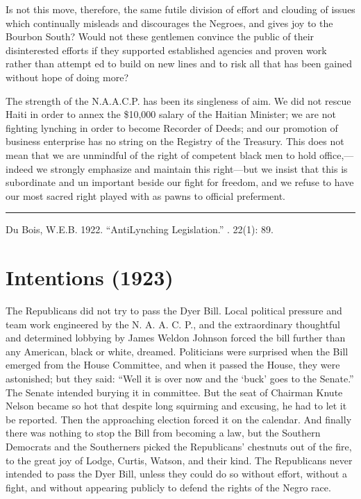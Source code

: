 \documentclass[letterpaper,10pt,english]{jupyterBook}
\begin{document}
\sphinxAtStartPar
Is not this move, therefore, the same futile division of effort and clouding of issues which continually misleads and discourages the Negroes, and gives joy to the Bourbon South? Would not these gentlemen convince the public of their disinterested efforts if they supported established agencies and proven work rather than attempt­ ed to build on new lines and to risk all that has been gained without hope of doing more?

\sphinxAtStartPar
The strength of the N.A.A.C.P. has been its singleness of aim. We did not rescue Haiti in order to annex the \$10,000 salary of the Haitian Minister; we are not fighting lynching in order to become Recorder of Deeds; and our promotion of business enterprise has no string on the Registry of the Treasury. This does not mean that we are unmindful of the right of competent black men to hold office,—indeed we strongly emphasize and maintain this right—but we in­sist that this is subordinate and un­ important beside our fight for freedom, and we refuse to have our most sacred right played with as pawns to official preferment.


\bigskip\hrule\bigskip


\sphinxAtStartPar
{} Du Bois, W.E.B. 1922. “Anti\sphinxhyphen{}Lynching Legislation.” . 22(1): 8\sphinxhyphen{}9.


\section{Intentions (1923)}
\label{\detokenize{Volumes/24/03/intentions:intentions-1923}}\label{\detokenize{Volumes/24/03/intentions::doc}}
\sphinxAtStartPar
The Republicans did not try to pass the Dyer Bill. Local political pressure and team work engineered by the N. A. A. C. P., and the extraordinary thoughtful and determined lobbying by James Weldon Johnson forced the bill further than any American, black or white, dreamed. Politicians were surprised when the Bill emerged from the House Committee, and when it passed the House, they were astonished; but they said: “Well it is over now and the ‘buck’ goes to the Senate.” The Senate intended burying it in committee. But the seat of Chairman Knute Nelson became so hot that despite long squirming and excusing, he had to let it be reported. Then the approaching election forced it on the calendar. And finally there was nothing to stop the Bill from becoming a law, but the Southern Democrats and the Southerners picked the Republicans’ chestnuts out of the fire, to the great joy of Lodge, Curtis, Watson, and their kind. The Republicans never intended to pass the Dyer Bill, unless they could do so without effort, without a fight, and without appearing publicly to defend the rights of the Negro race.
\end{document}
